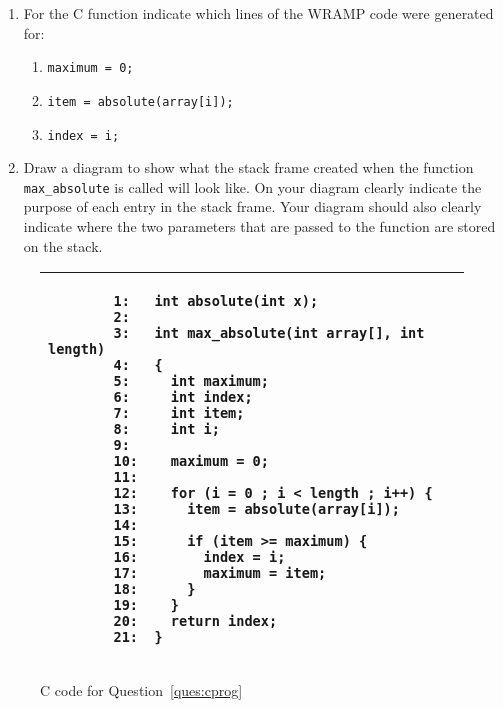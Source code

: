 \documentclass[a4paper,10pt]{article}
\begin{document}
\begin{enumerate}
\begin{enumerate}
  \item For the C function indicate which lines of the WRAMP code were
  generated for:
  \begin{enumerate}
   \item \verb+maximum = 0;+
   \item \verb+item = absolute(array[i]);+
   \item \verb+index = i;+
  \end{enumerate}


  \item Draw a diagram to show what the stack frame created when the
  function \verb+max_absolute+ is called will look like. On your
  diagram clearly indicate the purpose of each entry in the stack
  frame. Your diagram should also clearly indicate where the two
  parameters that are passed to the function are stored on the stack.
\end{enumerate}

\begin{figure}[h]
\begin{footnotesize}
\begin{center}
\begin{tabular}{|p{10cm}|}
\hline
\begin{verbatim}
        1:   int absolute(int x);
        2:   
        3:   int max_absolute(int array[], int length)
        4:   {
        5:     int maximum;
        6:     int index;
        7:     int item;
        8:     int i;
        9:   
        10:    maximum = 0;
        11:   
        12:    for (i = 0 ; i < length ; i++) {
        13:      item = absolute(array[i]);
        14:  
        15:      if (item >= maximum) {
        16:        index = i;
        17:        maximum = item;
        18:      }
        19:    }
        20:    return index;
        21:  }
\end{verbatim}
\\
\hline
\end{tabular}
\end{center}
\end{footnotesize}
\caption{C code for Question~\ref{ques:cprog}}
\label{fig:cprog}
\end{figure}


\end{enumerate}
\end{document}
